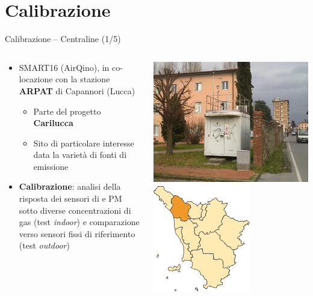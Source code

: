 \section{Calibrazione}

\begin{frame}{Calibrazione – Centraline (1/5)}
\begin{columns}
\begin{column}{0.58\textwidth}
\begin{itemize}
  \item \alert{SMART16} (AirQino), in co-locazione con la stazione \textbf{ARPAT} di Capannori (Lucca)\vspace{.1cm}
  \begin{itemize}
    \item Parte del progetto \textbf{Carilucca}\vspace{.1cm}
    \item Sito di particolare interesse data la varietà di fonti di emissione\,\footnotemark
  \end{itemize}\vspace{.05cm}
  \item \textbf{Calibrazione}: analisi della risposta dei sensori di  e PM sotto diverse concentrazioni di gas (test \textit{indoor}) e comparazione verso sensori fissi di riferimento (test \textit{outdoor})
\end{itemize}
\end{column}
\begin{column}{0.46\textwidth}
\vspace{-.2cm}
\begin{center}
\includegraphics[width=.45\textwidth]{images/lu-capannori}
\hspace{.2cm}
\includegraphics[width=.33\textwidth]{images/cartina-provincia-lucca}

\end{center}
\end{column}
\end{columns}
\end{frame}
